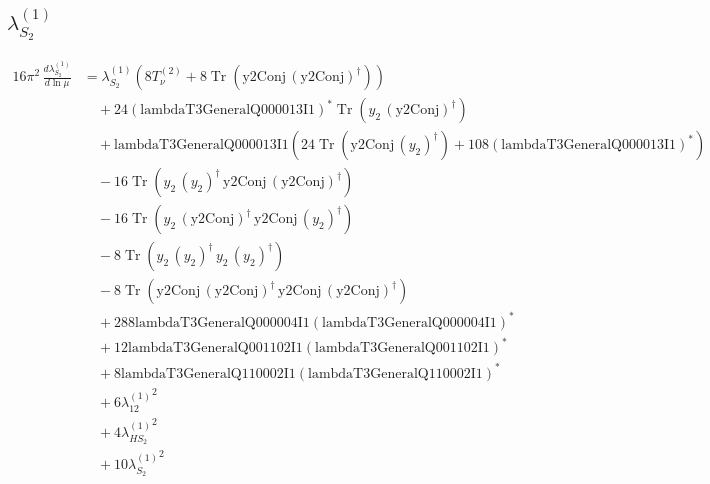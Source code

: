 \documentclass[10pt,a4paper]{article}
\begin{document}
\subsection*{$\lambda_{S_2}^{(1)}$}
\begin{align*}
16\pi^2\,\frac{d \lambda_{S_2}^{(1)}}{d\ln\mu} &={\lambda_{S_2}^{(1)}} (8 T_{\nu}^{(2)}+8 \operatorname{Tr}\!\left(\text{y2Conj}\,\left(\text{y2Conj}\right)^{\dagger}\right)) \\
&\quad +24 \left(\text{lambdaT3GeneralQ000013I1}\right)^{*} \operatorname{Tr}\!\left({y_2}\,\left(\text{y2Conj}\right)^{\dagger}\right) \\
&\quad +\text{lambdaT3GeneralQ000013I1} (24 \operatorname{Tr}\!\left(\text{y2Conj}\,\left({y_2}\right)^{\dagger}\right)+108 \left(\text{lambdaT3GeneralQ000013I1}\right)^{*}) \\
&\quad -16 \operatorname{Tr}\!\left({y_2}\,\left({y_2}\right)^{\dagger}\,\text{y2Conj}\,\left(\text{y2Conj}\right)^{\dagger}\right) \\
&\quad -16 \operatorname{Tr}\!\left({y_2}\,\left(\text{y2Conj}\right)^{\dagger}\,\text{y2Conj}\,\left({y_2}\right)^{\dagger}\right) \\
&\quad -8 \operatorname{Tr}\!\left({y_2}\,\left({y_2}\right)^{\dagger}\,{y_2}\,\left({y_2}\right)^{\dagger}\right) \\
&\quad -8 \operatorname{Tr}\!\left(\text{y2Conj}\,\left(\text{y2Conj}\right)^{\dagger}\,\text{y2Conj}\,\left(\text{y2Conj}\right)^{\dagger}\right) \\
&\quad +288 \text{lambdaT3GeneralQ000004I1} \left(\text{lambdaT3GeneralQ000004I1}\right)^{*} \\
&\quad +12 \text{lambdaT3GeneralQ001102I1} \left(\text{lambdaT3GeneralQ001102I1}\right)^{*} \\
&\quad +8 \text{lambdaT3GeneralQ110002I1} \left(\text{lambdaT3GeneralQ110002I1}\right)^{*} \\
&\quad +6 {\lambda_{12}^{(1)}}^2 \\
&\quad +4 {\lambda_{HS_2}^{(1)}}^2 \\
&\quad +10 {\lambda_{S_2}^{(1)}}^2 \\
\end{align*}
\end{document}
